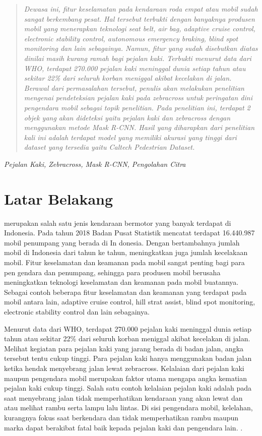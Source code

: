 \documentclass[conference]{IEEEtran}
\begin{document}
	
	\begin{abstract}
		\textit{Dewasa ini, fitur keselamatan pada kendaraan roda empat atau mobil sudah sangat berkembang pesat. Hal tersebut terbukti dengan banyaknya produsen mobil yang menerapkan teknologi seat belt, air bag, adaptive cruise control, electronic stability control, autonomous emergency braking, blind spot monitoring dan lain sebagainya. Namun, fitur yang sudah disebutkan diatas dinilai masih kurang ramah bagi pejalan kaki. Terbukti menurut data dari WHO, terdapat 270.000 pejalan kaki meninggal dunia setiap tahun atau sekitar 22\% dari seluruh korban meniggal akibat kecelakan di jalan. Berawal dari permasalahan tersebut, penulis akan melakukan penelitian mengenai pendeteksian pejalan kaki pada zebracross untuk peringatan dini pengendara mobil sebagai topik penelitian. Pada penelitian ini, terdapat 2 objek yang akan dideteksi yaitu pejalan kaki dan zebracross dengan menggunakan metode Mask R-CNN. Hasil yang diharapkan dari penelitian kali ini adalah terdapat model yang memiliki akurasi yang tinggi dari dataset yang tersedia yaitu Caltech Pedestrian Dataset.}
	\end{abstract}
	\begin{IEEEkeywords}
		\textit{Pejalan Kaki, Zebracross, Mask R-CNN, Pengolahan Citra}
	\end{IEEEkeywords}
	
	\section{Latar Belakang}
	 merupakan salah satu jenis kendaraan bermotor yang banyak terdapat di Indonesia. Pada tahun 2018 Badan Pusat Statistik mencatat terdapat 16.440.987 mobil penumpang yang berada di In donesia. Dengan bertambahnya jumlah mobil di Indonesia dari tahun ke tahun, meningkatkan juga jumlah kecelakaan mobil. Fitur keselamatan dan keamanan pada mobil sangat penting bagi para pen gendara dan penumpang, sehingga para produsen mobil berusaha meningkatkan teknologi keselamatan dan keamanan pada mobil buatannya. Sebagai contoh beberapa fitur keselamatan dan keamanan yang terdapat pada mobil antara lain, adaptive cruise control, hill strat assist, blind spot monitoring, electronic stability control dan lain sebagainya.\cite{cit:1}
	
	
	\vspace{1ex}
	
	Menurut data dari WHO, terdapat 270.000 pejalan kaki meninggal dunia setiap tahun atau sekitar 22\% dari seluruh korban meniggal akibat kecelakan di jalan. Melihat kegiatan para pejalan kaki yang jarang berada di badan jalan, angka tersebut tentu cukup tinggi. Para pejalan kaki hanya menggunakan badan jalan ketika hendak menyebrang jalan lewat zebracross. Kelalaian dari pejalan kaki maupun pengendara mobil merupakan faktor utama mengapa angka kematian pejalan kaki cukup tinggi. Salah satu contoh kelalaian pejalan kaki adalah pada saat menyebrang jalan tidak memperhatikan kendaraan yang akan lewat dan atau melihat rambu serta lampu lalu lintas. Di sisi pengendara mobil, kelelahan, kurangnya fokus saat berkendara dan tidak memperhatikan rambu maupun marka dapat berakibat fatal baik kepada pejalan kaki dan pengendara lain. \cite{cit:4}.
	
\end{document}
